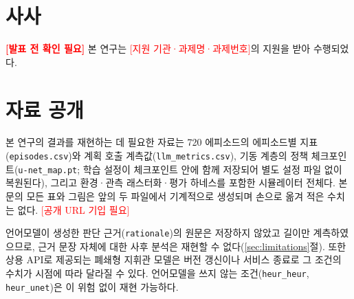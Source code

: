 \section*{사사}

\textcolor{red}{\textbf{[발표 전 확인 필요]}} 본 연구는 \textcolor{red}{[지원 기관·과제명·과제번호]}의
지원을 받아 수행되었다.

\section*{자료 공개}

본 연구의 결과를 재현하는 데 필요한 자료는 720 에피소드의 에피소드별
지표(\texttt{episodes.csv})와 계획 호출 계측값(\texttt{llm\_metrics.csv}), 기동 계층의 정책
체크포인트(\texttt{u-net\_map.pt}; 학습 설정이 체크포인트 안에 함께 저장되어 별도 설정 파일
없이 복원된다), 그리고 환경·관측 래스터화·평가 하네스를 포함한 시뮬레이터 전체다. 본문의 모든
표와 그림은 앞의 두 파일에서 기계적으로 생성되며 손으로 옮겨 적은 수치는 없다.
\textcolor{red}{[공개 URL 기입 필요]}

\vspace{3pt}
\noindent
언어모델이 생성한 판단 근거(\texttt{rationale})의 원문은
저장하지 않았고 길이만 계측하였으므로, 근거 문장 자체에 대한 사후 분석은 재현할 수
없다(\ref{sec:limitations}절). 또한 상용 API로 제공되는 폐쇄형 지휘관 모델은 버전 갱신이나
서비스 종료로 그 조건의 수치가 시점에 따라 달라질 수 있다. 언어모델을 쓰지 않는
조건(\texttt{heur\_heur}, \texttt{heur\_unet})은 이 위험 없이 재현 가능하다.
